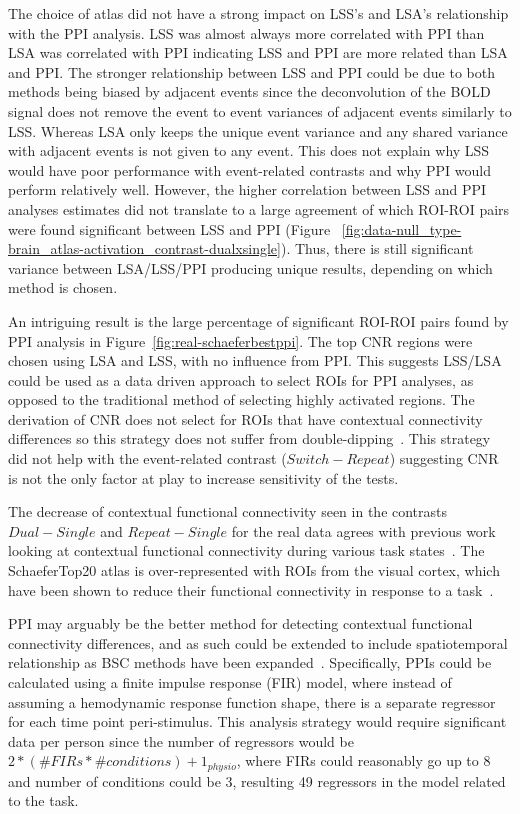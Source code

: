 \documentclass[phd,appendix,figures]{uithesis}
\begin{document}
The choice of atlas did not have a strong impact on LSS's and LSA's relationship with
the PPI analysis.
LSS was almost always more correlated with PPI than LSA was correlated with PPI indicating
LSS and PPI are more related than LSA and PPI.
The stronger relationship between LSS and PPI could be due to both methods being biased by adjacent
events since the deconvolution of the BOLD signal does not remove the event to event
variances of adjacent events similarly to LSS.
Whereas LSA only keeps the unique event variance and any shared variance with adjacent events
is not given to any event.
This does not explain why LSS would have poor performance with event-related contrasts
and why PPI would perform relatively well. 
However, the higher correlation between LSS and PPI analyses estimates
did not translate to a large agreement of which ROI-ROI pairs were found
significant between LSS and PPI (Figure ~\ref{fig:data-null_type-brain_atlas-activation_contrast-dualxsingle}).
Thus, there is still significant variance between LSA/LSS/PPI producing unique results,
depending on which method is chosen.

An intriguing result is the large percentage of significant ROI-ROI pairs found by
PPI analysis in Figure~\ref{fig:real-schaeferbestppi}.
The top CNR regions were chosen using LSA and LSS, with no influence from PPI.
This suggests LSS/LSA could be used as a data driven approach to select ROIs
for PPI analyses, as opposed to the traditional method of selecting
highly activated regions.
The derivation of CNR does not select for ROIs that have contextual
connectivity differences so this strategy does not suffer from
double-dipping~\cite{Kriegeskorte2009}.
This strategy did not help with the event-related contrast ($Switch - Repeat$)
suggesting CNR is not the only factor at play to increase sensitivity of
the tests.

The decrease of contextual functional connectivity seen in the contrasts
$Dual - Single$ and $Repeat - Single$ for the real data agrees with previous
work looking at contextual functional connectivity during various task states~\cite{Cole2014a,Spadone2015}.
The SchaeferTop20 atlas is over-represented with ROIs from the visual cortex, which have been shown
to reduce their functional connectivity in response to a task~\cite{Spadone2015}.

PPI may arguably be the better method for detecting contextual functional connectivity
differences, and as such could be extended to include spatiotemporal relationship as BSC methods
have been expanded~\cite{Turner2012a}.
Specifically, PPIs could be calculated using a finite impulse response (FIR) model, where instead of assuming
a hemodynamic response function shape, there is a separate regressor for each time point peri-stimulus.
This analysis strategy would require significant data per person since the number of regressors would be
$2 * (\#FIRs * \#conditions) + 1_{physio}$, where FIRs could reasonably go up to 8 and number of conditions could
be 3, resulting 49 regressors in the model related to the task.
\end{document}
